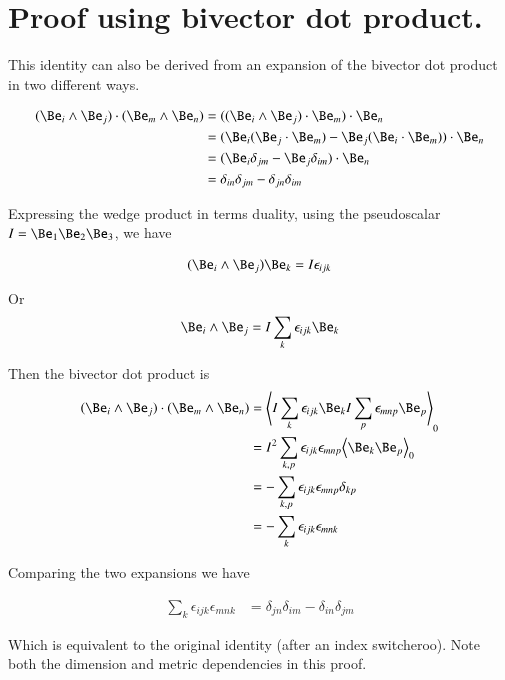 \section{Proof using bivector dot product. }

This identity can also be derived from an expansion of the bivector
dot product in two different ways.

\begin{align*}
( \Be_i \wedge \Be_j ) \cdot ( \Be_m \wedge \Be_n )
&=
( ( \Be_i \wedge \Be_j ) \cdot \Be_m ) \cdot \Be_n  \\
&=
( 
\Be_i ( \Be_j \cdot \Be_m ) 
-\Be_j ( \Be_i \cdot \Be_m ) 
) \cdot \Be_n  \\
&=
( \Be_i \delta_{jm} -\Be_j \delta_{im} ) \cdot \Be_n  \\
&=
\delta_{in} \delta_{jm} -\delta_{jn} \delta_{im} 
\end{align*}

Expressing the wedge product in terms duality, using the pseudoscalar
$I = \Be_1 \Be_2 \Be_3$, we have

\begin{align*}
(\Be_i \wedge \Be_j ) \Be_k = I \epsilon_{ijk}
\end{align*}

Or
\begin{align*}
\Be_i \wedge \Be_j = I \sum_k \epsilon_{ijk} \Be_k
\end{align*}

Then the bivector dot product is
\begin{align*}
( \Be_i \wedge \Be_j ) \cdot ( \Be_m \wedge \Be_n )
&=
\gpgradezero{
I \sum_k \epsilon_{ijk} \Be_k I \sum_p \epsilon_{mnp} \Be_p
} \\
&=
I^2 \sum_{k,p} \epsilon_{ijk} \epsilon_{mnp} \gpgradezero{ \Be_k \Be_p } \\
&=
- \sum_{k,p} \epsilon_{ijk} \epsilon_{mnp} \delta_{kp} \\
&=
- \sum_{k} \epsilon_{ijk} \epsilon_{mnk} \\
\end{align*}

Comparing the two expansions we have

\begin{align*}
\sum_{k} \epsilon_{ijk} \epsilon_{mnk} &= \delta_{jn} \delta_{im} - \delta_{in} \delta_{jm} 
\end{align*}

Which is equivalent to the original identity (after an index switcheroo).
Note both the dimension and metric dependencies in this proof.
